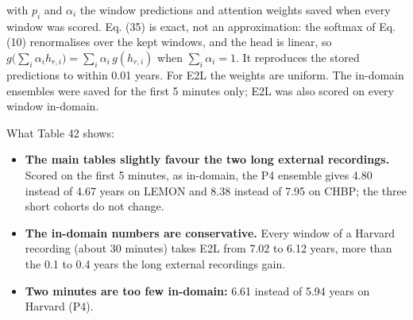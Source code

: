 \documentclass[11pt,a4paper]{article}
\begin{document}
with $p_i$ and $\alpha_i$ the window predictions and attention weights saved when every window was scored. Eq. (35) is exact, not an approximation: the softmax of Eq. (10) renormalises over the kept windows, and the head is linear, so $g\big(\sum_i \alpha_i h_{r,i}\big) = \sum_i \alpha_i\, g(h_{r,i})$ when $\sum_i \alpha_i = 1$. It reproduces the stored predictions to within 0.01 years. For E2L the weights are uniform. The in-domain ensembles were saved for the first 5 minutes only; E2L was also scored on every window in-domain.

\begin{table}[t]
\centering
\small
\caption{MAE in years by evaluation window. In-domain: after the 60 s trims. "—": not saved. TDBRAIN, Dortmund and SRM runs are at most 5 minutes long, so their 5-minute window holds every window.}
\end{table}


What Table 42 shows:

\begin{itemize}
\item \textbf{The main tables slightly favour the two long external recordings.} Scored on the first 5 minutes, as in-domain, the P4 ensemble gives 4.80 instead of 4.67 years on LEMON and 8.38 instead of 7.95 on CHBP; the three short cohorts do not change.
\item \textbf{The in-domain numbers are conservative.} Every window of a Harvard recording (about 30 minutes) takes E2L from 7.02 to 6.12 years, more than the 0.1 to 0.4 years the long external recordings gain.
\item \textbf{Two minutes are too few in-domain:} 6.61 instead of 5.94 years on Harvard (P4).
\end{itemize}
\end{document}
